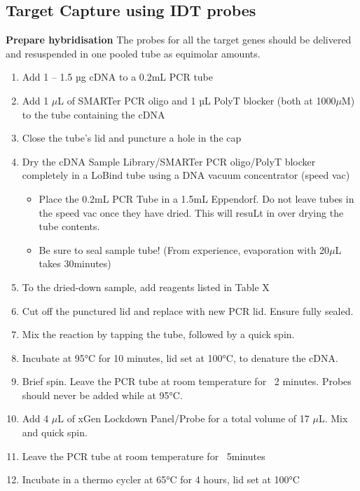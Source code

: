\subsection{Target Capture using IDT probes} 
\textbf{Prepare hybridisation}
The probes for all the target genes should be delivered and resuspended in one pooled tube as equimolar amounts. 
\begin{enumerate}
	\item Add 1 – 1.5 µg cDNA to a 0.2mL PCR tube 
	\item Add 1 $\mu$L of SMARTer PCR oligo and 1 µL PolyT blocker (both at 1000$\mu$M) to the tube containing the cDNA
	\item Close the tube’s lid and puncture a hole in the cap 
	\item Dry the cDNA Sample Library/SMARTer PCR oligo/PolyT blocker completely in a LoBind tube using a DNA vacuum concentrator (speed vac)
	\begin{itemize}
		\item Place the 0.2mL PCR Tube in a 1.5mL Eppendorf. Do not leave tubes in the speed vac once they have dried. This will resuLt in over drying the tube contents.
		\item Be sure to seal sample tube! (From experience, evaporation with 20$\mu$L takes 30minutes)
	\end{itemize}
	\item To the dried-down sample, add reagents listed in Table X 
	\item Cut off the punctured lid and replace with new PCR lid. Ensure fully sealed.
	\item Mix the reaction by tapping the tube, followed by a quick spin. 
	\item Incubate at 95°C for 10 minutes, lid set at 100°C, to denature the cDNA. 
	\item Brief spin. Leave the PCR tube at room temperature for ~2 minutes. Probes should never be added while at 95°C. 
	\item Add 4 $\mu$L of xGen Lockdown Panel/Probe for a total volume of 17 $\mu$L. Mix and quick spin. 
	\item Leave the PCR tube at room temperature for ~5minutes
	\item Incubate in a thermo cycler at 65°C for 4 hours, lid set at 100°C 
\end{enumerate} 

